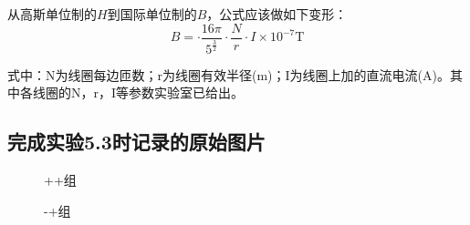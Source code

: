 \documentclass[a4paper]{article}
\begin{document}
从高斯单位制的$H$到国际单位制的$B$，公式应该做如下变形：
\begin{equation}
B = \cdot \frac{16\pi}{5^{\frac{3}{2}}}\cdot \frac{N}{r}\cdot I\times 10^{-7}\text{T}\label{eq10}
\end{equation}

式中：N为线圈每边匝数；r为线圈有效半径(m)；I为线圈上加的直流电流(A)。其中各线圈的N，r，I等参数实验室已给出。

\subsection{完成实验5.3时记录的原始图片}
\begin{figure}[htbp]
    \centering
    \hfill
    \caption{++组}
    \label{fig:subfig_1}
\end{figure}
\begin{figure}[htbp]
    \centering
    \hfill
    \caption{-+组}
    \label{fig:subfig_2}
\end{figure}
\end{document}
